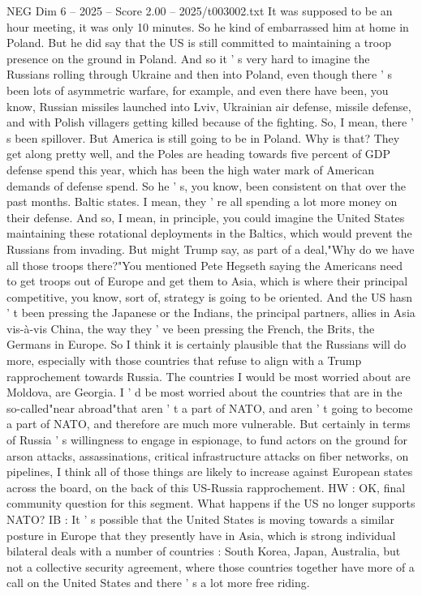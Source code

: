 \begin{textsample}{NEG Dim 6 – 2025 – Score 2.00 – 2025/t003002.txt}
It was supposed to be an hour meeting, it was only 10 minutes.
So he kind of embarrassed him at home in Poland.
But he did say that the US is still committed to maintaining a troop presence on the ground in Poland.
And so it ' s very hard to imagine the Russians rolling through Ukraine and then into Poland, even though there ' s been lots of asymmetric warfare, for example, and even there have been, you know, Russian missiles launched into Lviv, Ukrainian air defense, missile defense, and with Polish villagers getting killed because of the fighting.
So, I mean, there ' s been spillover.
But America is still going to be in Poland.
Why is that?
They get along pretty well, and the Poles are heading towards five percent of GDP defense spend this year, which has been the high water mark of American demands of defense spend.
So he ' s, you know, been consistent on that over the past months.
Baltic states.
I mean, they ' re all spending a lot more money on their defense.
And so, I mean, in principle, you could imagine the United States maintaining these rotational deployments in the Baltics, which would prevent the Russians from invading.
But might Trump say, as part of a deal,"Why do we have all those troops there?"You mentioned Pete Hegseth saying the Americans need to get troops out of Europe and get them to Asia, which is where their principal competitive, you know, sort of, strategy is going to be oriented.
And the US hasn ' t been pressing the Japanese or the Indians, the principal partners, allies in Asia vis-à-vis China, the way they ' ve been pressing the French, the Brits, the Germans in Europe.
So I think it is certainly plausible that the Russians will do more, especially with those countries that refuse to align with a Trump rapprochement towards Russia.
The countries I would be most worried about are Moldova, are Georgia.
I ' d be most worried about the countries that are in the so-called"near abroad"that aren ' t a part of NATO, and aren ' t going to become a part of NATO, and therefore are much more vulnerable.
But certainly in terms of Russia ' s willingness to engage in espionage, to fund actors on the ground for arson attacks, assassinations, critical infrastructure attacks on fiber networks, on pipelines, I think all of those things are likely to increase against European states across the board, on the back of this US-Russia rapprochement.
HW : OK, final community question for this segment.
What happens if the US no longer supports NATO?
IB : It ' s possible that the United States is moving towards a similar posture in Europe that they presently have in Asia, which is strong individual bilateral deals with a number of countries : South Korea, Japan, Australia, but not a collective security agreement, where those countries together have more of a call on the United States and there ' s a lot more free riding.

\end{textsample}
